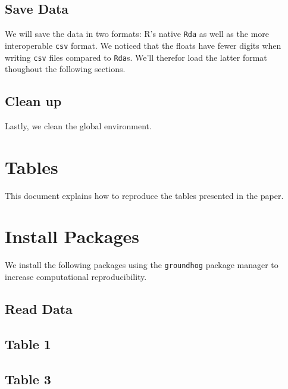 \documentclass[
  a4paper,
  DIV=11,
  numbers=noendperiod]{scrreprt}
\begin{document}
\hypertarget{save-data}{%
\section{Save Data}\label{save-data}}

We will save the data in two formats: R's native \texttt{Rda} as well as
the more interoperable \texttt{csv} format. We noticed that the floats
have fewer digits when writing \texttt{csv} files compared to
\texttt{Rda}s. We'll therefor load the latter format thoughout the
following sections.

\hypertarget{clean-up}{%
\section{Clean up}\label{clean-up}}

Lastly, we clean the global environment.


\hypertarget{tables}{%
\chapter{Tables}\label{tables}}

This document explains how to reproduce the tables presented in the
paper.


\hypertarget{install-packages-1}{%
\chapter{Install Packages}\label{install-packages-1}}

We install the following packages using the \texttt{groundhog} package
manager to increase computational reproducibility.

\hypertarget{read-data-1}{%
\section{Read Data}\label{read-data-1}}

\hypertarget{table-1}{%
\section{Table 1}\label{table-1}}

\hypertarget{table-3}{%
\section{Table 3}\label{table-3}}
\end{document}
